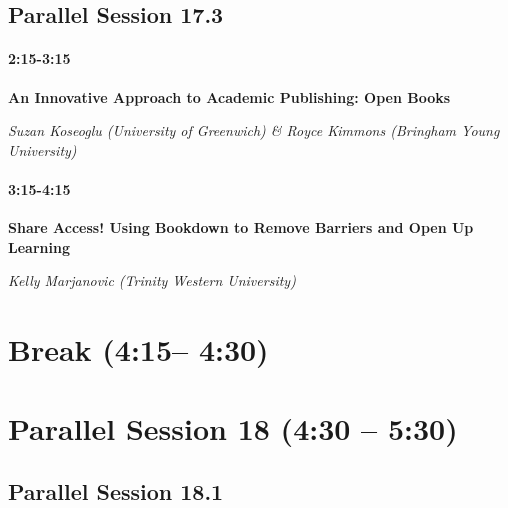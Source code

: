 \documentclass[
]{book}
\begin{document}
\hypertarget{parallel-session-17.3}{%
\subsection*{Parallel Session 17.3}\label{parallel-session-17.3}}

\begin{todo}
\hypertarget{section}{%
\paragraph{2:15-3:15}\label{section}}

\textbf{An Innovative Approach to Academic Publishing: Open Books}

\emph{Suzan Koseoglu (University of Greenwich) \& Royce Kimmons
(Bringham Young University)}
\end{todo}

\begin{todo}
\hypertarget{section}{%
\paragraph{3:15-4:15}\label{section}}

\textbf{Share Access! Using Bookdown to Remove Barriers and Open Up
Learning}

\emph{Kelly Marjanovic (Trinity Western University)}
\end{todo}

\hypertarget{break-415-430}{%
\section*{Break (4:15-- 4:30)}\label{break-415-430}}

\hypertarget{parallel-session-18-430-530}{%
\section*{Parallel Session 18 (4:30 -- 5:30)}\label{parallel-session-18-430-530}}

\hypertarget{parallel-session-18.1}{%
\subsection*{Parallel Session 18.1}\label{parallel-session-18.1}}
\end{document}
